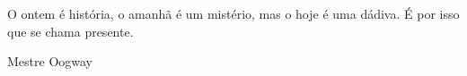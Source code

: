 \epigraph{O ontem é história, o amanhã é um mistério, mas o hoje é uma dádiva. É por isso que se chama presente.}{Mestre Oogway}